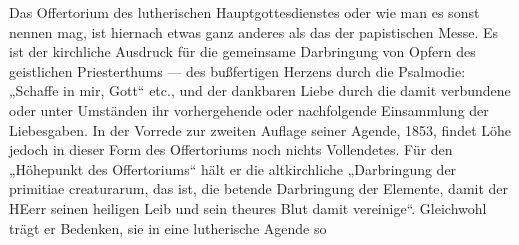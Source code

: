 Das Offertorium des lutherischen Hauptgottesdienstes oder wie man es sonst nennen mag, ist hiernach etwas ganz anderes als das der papistischen Messe. Es ist der kirchliche Ausdruck für die gemeinsame Darbringung von Opfern des geistlichen Priesterthums — des bußfertigen Herzens durch die Psalmodie: „Schaffe in mir, Gott“ etc., und der dankbaren Liebe durch die damit verbundene oder unter Umständen ihr vorhergehende oder nachfolgende Einsammlung der Liebesgaben. In der Vorrede zur zweiten Auflage seiner Agende, 1853, findet Löhe jedoch in dieser Form des Offertoriums noch nichts Vollendetes. Für den „Höhepunkt des Offertoriums“ hält er die altkirchliche „Darbringung der primitiae creaturarum, das ist, die betende Darbringung der Elemente, damit der HEerr seinen heiligen Leib und sein theures Blut damit vereinige“. Gleichwohl trägt er Bedenken, sie in eine lutherische Agende so
